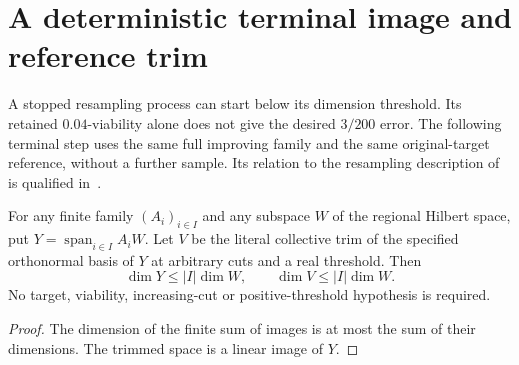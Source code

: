 \section{A deterministic terminal image and reference trim}

A stopped resampling process can start below its dimension threshold.
Its retained $0.04$-viability alone does not give the desired $3/200$ error.
The following terminal step uses the same full improving family and the same
original-target reference, without a further sample. Its relation to the
resampling description of~\cite[lines 749--755]{Arad2016RigorousRG} is
qualified in~\cite{gap:alvv16_bootstrap_constants}.

\begin{lemma}
    \label{lem:terminal_family_trim_dimension}
    \leanok
    For any finite family $(A_i)_{i\in I}$ and any subspace $W$ of the
    regional Hilbert space, put $Y=\operatorname{span}_{i\in I}A_iW$.
    Let $V$ be the literal collective trim of the specified orthonormal
    basis of $Y$ at arbitrary cuts and a real threshold. Then
    \[
        \dim Y\le|I|\dim W,\qquad \dim V\le|I|\dim W.
    \]
    No target, viability, increasing-cut or positive-threshold hypothesis
    is required.
\end{lemma}
\begin{proof}\leanok
    The dimension of the finite sum of images is at most the sum of their
    dimensions. The trimmed space is a linear image of $Y$.
\end{proof}

